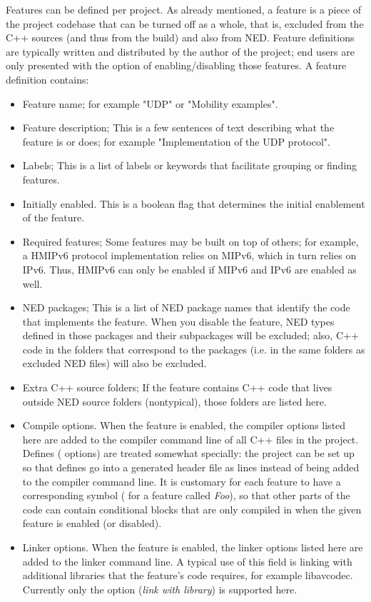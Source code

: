 Features can be defined per project. As already mentioned, a feature is a piece of the
project codebase that can be turned off as a whole, that is, excluded from the C++ sources
(and thus from the build) and also from NED. Feature definitions are typically written
and distributed by the author of the project; end users are only presented with the
option of enabling/disabling those features. A feature definition contains:

\begin{itemize}
  \item Feature name; for example "UDP" or "Mobility examples".
  \item Feature description; This is a few sentences of text describing what the feature
    is or does; for example "Implementation of the UDP protocol".
  \item Labels; This is a list of labels or keywords that facilitate grouping or finding features.
  \item Initially enabled. This is a boolean flag that determines the initial enablement
    of the feature.
\item Required features; Some features may be built on top of others; for example, a HMIPv6
    protocol implementation relies on MIPv6, which in turn relies on IPv6. Thus, HMIPv6 can
    only be enabled if MIPv6 and IPv6 are enabled as well.
\item NED packages; This is a list of NED package names that identify the code that implements
    the feature. When you disable the feature, NED types defined in those packages and their
    subpackages will be excluded; also, C++ code in the folders that correspond to the packages
    (i.e. in the same folders as excluded NED files) will also be excluded.
\item Extra C++ source folders; If the feature contains C++ code that lives outside NED source
    folders (nontypical), those folders are listed here.
\item Compile options. When the feature is enabled, the compiler options listed
    here are added to the compiler command line of all C++ files in the project.
    Defines ( options) are treated somewhat specially: the project can
    be set up so that defines go into a generated header file as 
    lines instead of being added to the compiler command line. It is
    customary for each feature to have a corresponding symbol
    ( for a feature called \textit{Foo}), so that other parts of
    the code can contain conditional blocks that are only compiled in when the
    given feature is enabled (or disabled). 
\item Linker options. When the feature is enabled, the linker options listed here are added
    to the linker command line. A typical use of this field is linking with additional
    libraries that the feature's code requires, for example libavcodec.
    Currently only the  option (\textit{link with library}) is supported here.
\end{itemize}


